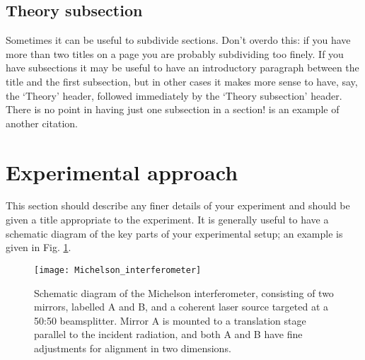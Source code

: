 \documentclass[11pt]{article} %
\newcommand{\citet}{\cite} %
\begin{document}
\subsection{Theory subsection}
Sometimes it can be useful to subdivide sections. Don’t overdo this: if you have more than two titles on a page you are probably subdividing too finely. If you have subsections it may be useful to have an introductory paragraph between the title and the first subsection, but in other cases it makes more sense to have, say, the ‘Theory’ header, followed immediately by the ‘Theory subsection’ header. There is no point in having just one subsection in a section! \citet{Einstein1905} is an example of another citation.


\section{Experimental approach}
This section should describe any finer details of your experiment and should be given a title appropriate to the experiment. It is generally useful to have a schematic diagram of the key parts of your experimental setup; an example is given in Fig. \ref{Michelson}.\\

\begin{figure} %
\centering %
\texttt{[image: Michelson\_interferometer]} %
\caption{Schematic diagram of the Michelson interferometer, consisting of two mirrors, labelled A and B, and a coherent laser source targeted at a 50:50 beamsplitter. Mirror A is mounted to a translation stage parallel to the incident radiation, and both A and B have fine adjustments for alignment in two dimensions.} %
\label{Michelson} %
\end{figure}
\end{document}
